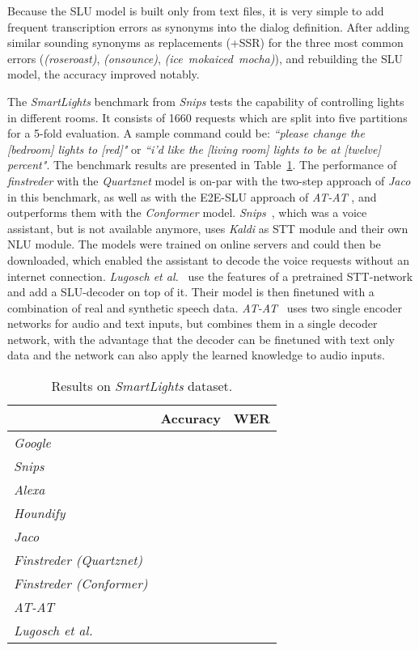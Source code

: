 \documentclass[a4paper]{article}
\begin{document}
Because the SLU model is built only from text files, it is very simple to add frequent transcription errors as synonyms into the dialog definition. After adding similar sounding synonyms as replacements (+SSR) for the three most common errors (\textit{(roseroast)}, \textit{(onsounce)}, \textit{(ice~mokaiced~mocha)}), and rebuilding the SLU model, the accuracy improved notably.

\vspace{9pt}
The \textit{SmartLights} benchmark from \textit{Snips} \cite{SNSLU} tests the capability of controlling lights in different rooms. It consists of 1660 requests which are split into five partitions for a 5-fold evaluation. A sample command could be: \textit{``please change the [bedroom] lights to [red]"} or \textit{``i'd like the [living room] lights to be at [twelve] percent"}. The benchmark results are presented in Table~\ref{tab:ben_slc}. The performance of \textit{finstreder} with the \textit{Quartznet} model is on-par with the two-step approach of \textit{Jaco} in this benchmark, as well as with the E2E-SLU approach of \textit{AT-AT} \cite{ATAT}, and outperforms them with the \textit{Conformer} model. \textit{Snips}~\cite{SNIPS}, which was a voice assistant, but is not available anymore, uses \textit{Kaldi} as STT module and their own NLU module. The models were trained on online servers and could then be downloaded, which enabled the assistant to decode the voice requests without an internet connection. \textit{Lugosch et al.}~\cite{SYNSLU} use the features of a pretrained STT-network and add a SLU-decoder on top of it. Their model is then finetuned with a combination of real and synthetic speech data. \textit{AT-AT}~\cite{ATAT} uses two single encoder networks for audio and text inputs, but combines them in a single decoder network, with the advantage that the decoder can be finetuned with text only data and the network can also apply the learned knowledge to audio inputs. 

\begin{table}[!htbp]
	\footnotesize
	\caption{Results on \textit{SmartLights} dataset.}
	\vspace{-5pt}
	\label{tab:ben_slc}
	\centering
	\begin{tabular}{lcc}
		\toprule
		\textbf{} & \textbf{Accuracy} & \textbf{WER} \\
		\midrule
		\textit{Google} \cite{SNSLU} &  &  \\
		\textit{Snips} \cite{SNSLU} &  &  \\
		\textit{Alexa} \cite{JACO} &  &  \\
		\textit{Houndify} \cite{JACO} &  &  \\
		\textit{Jaco} \cite{JACO} &  &  \\
		\textit{Finstreder (Quartznet)} &  &  \\
		\textit{Finstreder (Conformer)} &  &  \\
		\textit{AT-AT} \cite{ATAT} &  &  \\
		\textit{Lugosch et al.} \cite{SYNSLU} &  &  \\
		\bottomrule
	\end{tabular}
\end{table}
\end{document}
